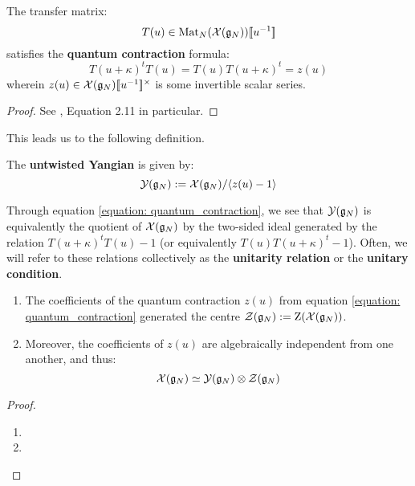         \begin{lemma} \label{lemma: quantum_contractions}
            The transfer matrix:
                $$T(u) \in \mathrm{Mat}_N( \mathcal{X}(\mathfrak{g}_N) )[\![u^{-1}]\!]$$
            satisfies the \textbf{quantum contraction} formula:
                \begin{equation} \label{equation: quantum_contraction}
                    T(u + \kappa)^t T(u) = T(u) T(u + \kappa)^t = z(u)
                \end{equation}
            wherein $z(u) \in \calX(\g_N)[\![u^{-1}]\!]^{\x}$ is some invertible scalar series.
        \end{lemma}
            \begin{proof}
                See \cite[Section 2]{guay_regelskis_twisted_yangians_for_symmetric_pairs_of_types_BCD}, Equation 2.11 in particular.
            \end{proof}
            
        This leads us to the following definition.
        \begin{definition} \label{def: untwisted_yangians}
            The \textbf{untwisted Yangian} is given by:
                $$\mathcal{Y}(\mathfrak{g}_N) := \mathcal{X}(\mathfrak{g}_N)/\langle z(u) - 1\rangle$$
        \end{definition}
        \begin{remark}[Unitarity]
            Through equation \eqref{equation: quantum_contraction}, we see that $\mathcal{Y}(\mathfrak{g}_N)$ is equivalently the quotient of $\mathcal{X}(\mathfrak{g}_N)$ by the two-sided ideal generated by the relation $T(u + \kappa)^t T(u) - 1$ (or equivalently $T(u) T(u + \kappa)^t - 1$). Often, we will refer to these relations collectively as the \textbf{unitarity relation} or the \textbf{unitary condition}.
        \end{remark}
        \begin{lemma} \label{lemma: centres_of_extended_untwisted_yangians}
            \begin{enumerate}
                \item The coefficients of the quantum contraction $z(u)$ from equation \eqref{equation: quantum_contraction} generated the centre $\mathcal{Z}(\mathfrak{g}_N) := \mathrm{Z}( \mathcal{X}(\mathfrak{g}_N) )$.
                \item Moreover, the coefficients of $z(u)$ are algebraically independent from one another, and thus:
                    $$\calX(\g_N) \cong \calY(\g_N) \tensor \calZ(\g_N)$$
            \end{enumerate}
        \end{lemma}
            \begin{proof}
                \begin{enumerate}
                    \item 
                    \item 
                \end{enumerate}
            \end{proof}

